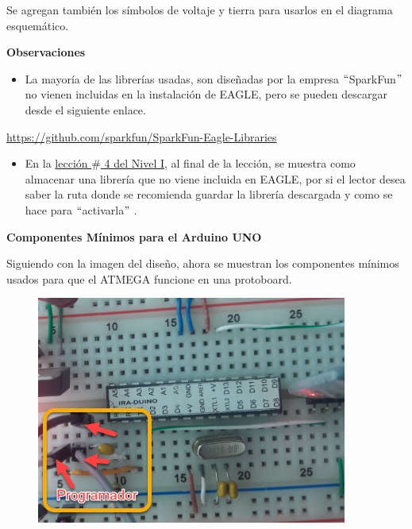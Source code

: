 \documentclass[12pt]{article}
\begin{document}

Se agregan también los símbolos de voltaje y tierra para usarlos en el diagrama esquemático.\par

{\fontsize{14pt}{16.8pt}\selectfont \textbf{Observaciones}\par}\par

\begin{itemize}
	\item La mayoría de las librerías usadas, son diseñadas por la empresa $``$SparkFun$"$  no vienen incluidas en la instalación de EAGLE, pero se pueden descargar desde el siguiente enlace. 
\end{itemize}\par

\href{https://github.com/sparkfun/SparkFun-Eagle-Libraries}{https://github.com/sparkfun/SparkFun-Eagle-Libraries}\par

\begin{itemize}
	\item En la \href{https://pcbcentral.com/pcb-1-adaptador-soic-a-dip-parte-ii-diagrama-esquematico}{lección $\#$ 4 del Nivel I}, al final de la lección, se muestra como almacenar una librería que no viene incluida en EAGLE, por si el lector desea saber la ruta donde se recomienda guardar la librería descargada y como se hace para $``$activarla$"$ . 
\end{itemize}\par

{\fontsize{14pt}{16.8pt}\selectfont \textbf{Componentes Mínimos para el Arduino UNO}\par}\par

Siguiendo con la imagen del diseño, ahora se muestran los componentes mínimos usados para que el ATMEGA funcione en una protoboard.\par




\begin{figure}[H]
	\begin{Center}
		\includegraphics[width=4.02in,height=2.94in]{./media/image16.jpeg}
	\end{Center}
\end{figure}
\end{document}
